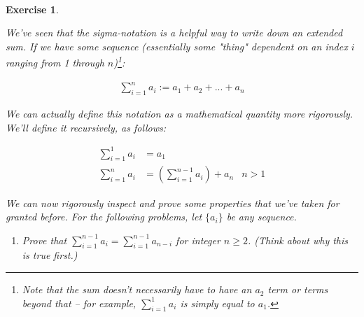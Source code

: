 \documentclass{article}
\newtheorem{exercise}{\\ \bf Exercise}
\begin{document}
\begin{exercise}
\label{defining-sigma}


We've seen that the sigma-notation is a helpful way to write down an extended sum. If we have some sequence (essentially some "thing" dependent on an index $i$ ranging from 1 through $n$)\footnote{Note that the sum doesn't necessarily have to have an $a_2$ term or terms beyond that -- for example, $\sum_{i=1}^1 a_i$ is simply equal to $a_1$.}:

\begin{align*}
\sum_{i=1}^n a_i := a_1 + a_2 + ... + a_n 
\end{align*}


We can actually define this notation as a mathematical quantity more rigorously. We'll define it recursively, as follows:


\begin{align*}
\sum_{i=1}^1 a_i &= a_1 \\
\sum_{i=1}^n a_i &= \left(\sum_{i=1}^{n-1} a_i\right) + a_n & n > 1
\end{align*}

We can now rigorously inspect and prove some properties that we've taken for granted before. For the following problems, let $\{a_i\}$ be any sequence. 

\begin{enumerate}
\item Prove that $\sum_{i=1}^{n-1} a_i = \sum_{i=1}^{n-1} a_{n-i}$ for integer $n \geq 2$. (Think about why this is true first.)
\end{enumerate}


\end{exercise}
\end{document}
